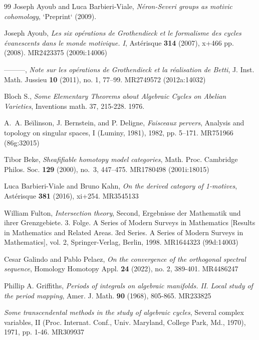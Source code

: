\documentclass[10pt]{amsart}
\theoremstyle{definition}
\theoremstyle{remark}
\theoremstyle{definition}
\begin{document}
\newpage
\begin{thebibliography}{99}
Joseph Ayoub and Luca Barbieri-Viale, \emph{N\'eron-Severi groups as motivic cohomology}, `Preprint` (2009).

Joseph Ayoub, \emph{Les six op\'erations de Grothendieck et le formalisme des cycles
  \'evanescents dans le monde motivique. I}, Ast\'erisque \textbf{314} (2007),
  x+466 pp. (2008). MR2423375 (2009i:14006)

---------, \emph{Note sur les op\'erations de Grothendieck et la r\'ealisation de
  Betti}, J. Inst. Math. Jussieu \textbf{10} (2011), no. 1, 77--99. MR2749572
  (2012a:14032)

  Bloch S., \textit{Some Elementary Theorems about Algebraic Cycles on Abelian Varieties}, Inventions math. 37, 215-228. 1976.

A.~A. Be{\u\i}linson, J. Bernstein, and P. Deligne, \emph{Faisceaux pervers},
  Analysis and topology on singular spaces, I (Luminy, 1981), 1982, pp. 5--171.
  MR751966 (86g:32015)

Tibor Beke, \emph{Sheafifiable homotopy model categories}, Math. Proc. Cambridge
  Philos. Soc. \textbf{129} (2000), no.~3, 447--475. MR1780498 (2001i:18015)

Luca Barbieri-Viale and Bruno Kahn, \emph{On the derived category of 1-motives},
  Ast\'erisque \textbf{381} (2016), xi+254. MR3545133

 William Fulton, \textit{Intersection theory}, Second, Ergebnisse der Mathematik und ihrer Grenzgebiete. 3. Folge. A Series of Modern Surveys in Mathematics [Results in Mathematics and Related Areas. 3rd Series. A Series of Modern Surveys in Mathematics], vol. 2, Springer-Verlag, Berlin, 1998. MR1644323 (99d:14003)

 Cesar Galindo and Pablo Pelaez, \textit{On the convergence of the orthogonal spectral sequence}, Homology Homotopy Appl. \textbf{24} (2022), no. 2, 389-401. MR4486247

 Phillip A. Griffiths, \textit{Periods of integrals on algebraic manifolds. II. Local study of the period mapping}, Amer. J. Math. \textbf{90} (1968), 805-865. MR233825

 \textit{Some transcendental methods in the study of algebraic cycles}, Several complex variables, II (Proc. Internat. Conf., Univ. Maryland, College Park, Md., 1970), 1971, pp. 1-46. MR309937


\end{thebibliography}
\end{document}
